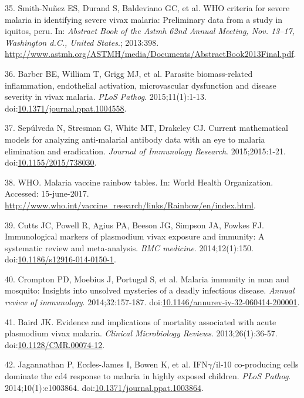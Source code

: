 \documentclass[]{article}
\begin{document}
\hypertarget{ref-smith2013}{}
35. Smith-Nuñez ES, Durand S, Baldeviano GC, et al. WHO criteria for
severe malaria in identifying severe vivax malaria: Preliminary data
from a study in iquitos, peru. In: \emph{Abstract Book of the Astmh 62nd
Annual Meeting, Nov. 13--17, Washington d.C., United States}.; 2013:398.
\url{http://www.astmh.org/ASTMH/media/Documents/AbstractBook2013Final.pdf}.

\hypertarget{ref-barber2015}{}
36. Barber BE, William T, Grigg MJ, et al. Parasite biomass-related
inflammation, endothelial activation, microvascular dysfunction and
disease severity in vivax malaria. \emph{PLoS Pathog}. 2015;11(1):1-13.
doi:\href{https://doi.org/10.1371/journal.ppat.1004558}{10.1371/journal.ppat.1004558}.

\hypertarget{ref-sepulveda2015}{}
37. Sepúlveda N, Stresman G, White MT, Drakeley CJ. Current mathematical
models for analyzing anti-malarial antibody data with an eye to malaria
elimination and eradication. \emph{Journal of Immunology Research}.
2015;2015:1-21.
doi:\href{https://doi.org/10.1155/2015/738030}{10.1155/2015/738030}.

\hypertarget{ref-rainbow2016}{}
38. WHO. Malaria vaccine rainbow tables. In: World Health Organization.
Accessed: 15-june-2017.
\url{http://www.who.int/vaccine_research/links/Rainbow/en/index.html}.

\hypertarget{ref-cutts2014meta}{}
39. Cutts JC, Powell R, Agius PA, Beeson JG, Simpson JA, Fowkes FJ.
Immunological markers of plasmodium vivax exposure and immunity: A
systematic review and meta-analysis. \emph{BMC medicine}.
2014;12(1):150.
doi:\href{https://doi.org/10.1186/s12916-014-0150-1}{10.1186/s12916-014-0150-1}.

\hypertarget{ref-crompton2014rev}{}
40. Crompton PD, Moebius J, Portugal S, et al. Malaria immunity in man
and mosquito: Insights into unsolved mysteries of a deadly infectious
disease. \emph{Annual review of immunology}. 2014;32:157-187.
doi:\href{https://doi.org/10.1146/annurev-iy-32-060414-200001}{10.1146/annurev-iy-32-060414-200001}.

\hypertarget{ref-baird2013}{}
41. Baird JK. Evidence and implications of mortality associated with
acute plasmodium vivax malaria. \emph{Clinical Microbiology Reviews}.
2013;26(1):36-57.
doi:\href{https://doi.org/10.1128/CMR.00074-12}{10.1128/CMR.00074-12}.

\hypertarget{ref-jagannathan2014}{}
42. Jagannathan P, Eccles-James I, Bowen K, et al. IFN\(\gamma\)/il-10
co-producing cells dominate the cd4 response to malaria in highly
exposed children. \emph{PLoS Pathog}. 2014;10(1):e1003864.
doi:\href{https://doi.org/10.1371/journal.ppat.1003864}{10.1371/journal.ppat.1003864}.
\end{document}
